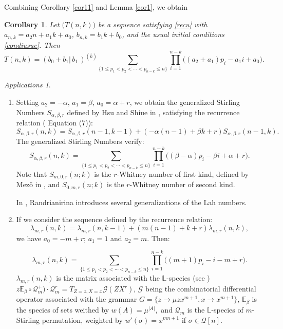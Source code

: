 \documentclass[12pt,a4paper]{article}
\newtheorem{corollary}[theorem]{Corollary}%
\theoremstyle{definition} %
\theoremstyle{remark}
\theoremstyle{examples}
\newtheorem{appli}[theorem]{Applications}
\newcommand{\suit}[1]{{#1}(n,k)}
\newcommand{\coul}[1]{#1_{n,k}}
\newcommand{\argtgen}[3]{(#1|#2)^{(\overline{#3})}}
\newcommand{\coss}{\cdots}
\begin{document}
	
\noindent Combining Corollary \ref{cor11} and Lemma \ref{cor1}, we obtain
\begin{corollary}\label{corrnerw}
	Let $\big(\suit{T}\big)$ be a sequence satisfying \eqref{recu} with $\coul{a} = a_2n+a_1 k + a_0$, $\coul{b} = b_1k+b_0$, and the usual initial conditions \eqref{condiusue}. 
	Then
	\begin{equation}
		\suit{T} =\argtgen{b_0 + b_1}{\, b_1 \,}{k} \sum_{\{1\leq p_1<p_2<\coss <p_{n-k}\leq n\}}  
		\prod_{i=1}^{n-k} \Big( (a_2+a_1)p_i-a_1i+a_0 \Big).
	\end{equation}
\end{corollary}	
	
	
	
\begin{appli}\rm\label{appli1}
	\begin{enumerate}
\item Setting $a_2=-\alpha$, $a_1=\beta$, $a_0=\alpha+r$, we obtain the generalized Stirling Numbers $S_{\alpha,\beta,r}$ defined by Hsu and Shiue in \cite{hsu1998unified}, satisfying the recurrence relation (\cite{hsu1998unified} Equation (7)):
\begin{equation}
S_{\alpha,\beta,r}(n,k)=S_{\alpha,\beta,r}(n-1,k-1)+(-\alpha (n-1)+\beta k+r)S_{\alpha,\beta,r}(n-1,k).
\end{equation}
The generalized Stirling Numbers verify:
\begin{equation}\label{genestir}
S_{\alpha,\beta,r}(n,k)= \sum_{\{1\leq p_1<p_2<\coss <p_{n-k}\leq n\}}  
\prod_{i=1}^{n-k} \Big( (\beta-\alpha)p_i-\beta i+\alpha+r \Big).
\end{equation} 
Note that $S_{m,0,r}(n;k)$ is  the $r$-Whitney number of first kind, defined by Mez\"o in \cite{Mezo2010Bernoulli}, and  $S_{0,m,r}(n;k)$ is  the $r$-Whitney number of second kind.

 In \cite{rabeza}, Randrianirina introduces several generalizations of the Lah numbers.

\item \label{br1} If we consider the sequence defined by the recurrence
relation:
\begin{equation}
\lambda_{m,r}(n,k)=\lambda_{m,r}(n,k-1)+(m(n-1)+k+r)\lambda_{m,r}(n,k),
\label{equav3}
\end{equation}
we have $a_0=-m+r$; $a_1=1$ and $a_2=m$. Then:

\begin{equation}\label{equabase2}
\lambda_{m,r}(n,k)=\sum_{\{1\leq p_1<p_2<\coss <p_{n-k}\leq n\}}  
\prod_{i=1}^{n-k} \Big( (m+1)p_i-i-m+r \Big).
\end{equation}
$\lambda_{m,r}(n,k)$ is the matrix associated with the $\mathbb{L}$-species (see \cite{rabeza2}) $z\mathbb{E}_\beta\circ \mathcal{Q}_m^+)\cdot\mathcal{Q}_m^r=T_{Z=z,X=x}\mathcal{G}(ZX^r)$, $\mathcal{G}$ being the combinatorial differential operator associated with the grammar $G=\{z\to \mu zx^{m+1}, x\to x^{m+1}\}$, $\mathbb{E}_\beta$ is the species of sets weithed by $w(A)=\mu^{|A|},$ and $\mathcal{Q}_m$ is the $\mathbb{L}$-species of $m$-Stirling permutation, weighted by $w'(\sigma)=x^{mn+1}$ if $\sigma\in\mathcal{Q}[n]$.


\end{enumerate}
\end{appli}
\end{document}
